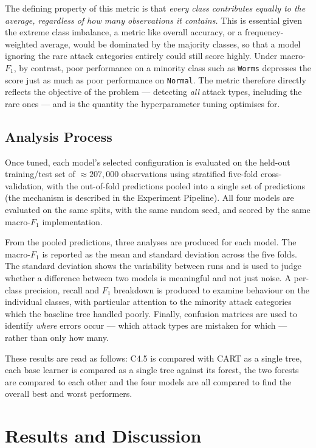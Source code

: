 \documentclass[conference]{IEEEtran}
\begin{document}
The defining property of this metric is that \emph{every class contributes equally to the average,
regardless of how many observations it contains.} This is essential given the extreme class
imbalance, a metric like overall accuracy, or a frequency-weighted average, would be dominated by
the majority classes, so that a model ignoring the rare attack categories entirely could still score
highly. Under macro-$F_1$, by contrast, poor performance on a minority class such as \texttt{Worms}
depresses the score just as much as poor performance on \texttt{Normal}. The metric therefore
directly reflects the objective of the problem --- detecting \emph{all} attack types, including the
rare ones --- and is the quantity the hyperparameter tuning optimises for.

\subsection{Analysis Process} %

Once tuned, each model's selected configuration is evaluated on the held-out training/test set of
$\approx\!207{,}000$ observations using stratified five-fold cross-validation, with the out-of-fold
predictions pooled into a single set of predictions (the mechanism is described in the Experiment
Pipeline). All four models are evaluated on the same splits, with the same random seed, and scored
by the same macro-$F_1$ implementation.

From the pooled predictions, three analyses are produced for each model. The macro-$F_1$ is reported
as the mean and standard deviation across the five folds. The standard deviation shows the
variability between runs and is used to judge whether a difference between two models is meaningful
and not just noise. A per-class precision, recall and $F_1$ breakdown is
produced to examine behaviour on the individual classes, with particular attention to the minority
attack categories which the baseline tree handled poorly. Finally, confusion matrices are used to
identify \emph{where} errors occur --- which attack types are mistaken for which --- rather than
only how many.

These results are read as follows: C4.5 is compared with
CART as a single tree, each base learner is compared as a single tree against its forest, the two 
forests are compared to each other and the four models are all compared to find the overall best and
worst performers.

\section{Results and Discussion} %
\end{document}
